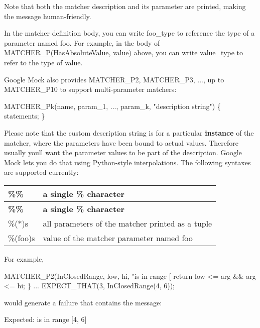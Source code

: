Note that both the matcher description and its parameter are printed, making the message human-\/friendly.

In the matcher definition body, you can write {\ttfamily foo\+\_\+type} to reference the type of a parameter named {\ttfamily foo}. For example, in the body of {\ttfamily \hyperlink{gmock-generated-matchers_8h_acb7ae915efa2fd8d3f6ea7313198afb6}{M\+A\+T\+C\+H\+E\+R\+\_\+\+P(\+Has\+Absolute\+Value, value)}} above, you can write {\ttfamily value\+\_\+type} to refer to the type of {\ttfamily value}.

Google Mock also provides {\ttfamily M\+A\+T\+C\+H\+E\+R\+\_\+\+P2}, {\ttfamily M\+A\+T\+C\+H\+E\+R\+\_\+\+P3}, ..., up to {\ttfamily M\+A\+T\+C\+H\+E\+R\+\_\+\+P10} to support multi-\/parameter matchers\+: 
\begin{DoxyCode}
MATCHER\_Pk(name, param\_1, ..., param\_k, "description string") \{ statements; \}
\end{DoxyCode}


Please note that the custom description string is for a particular {\bfseries instance} of the matcher, where the parameters have been bound to actual values. Therefore usually you\textquotesingle{}ll want the parameter values to be part of the description. Google Mock lets you do that using Python-\/style interpolations. The following syntaxes are supported currently\+:

\tabulinesep=1mm
\begin{longtabu} spread 0pt [c]{*{2}{|X[-1]}|}
\hline
\rowcolor{\tableheadbgcolor}\textbf{ {\ttfamily \%\%} }&\textbf{ a single {\ttfamily \%} character  }\\
\endfirsthead
\hline
\endfoot
\hline
\rowcolor{\tableheadbgcolor}\textbf{ {\ttfamily \%\%} }&\textbf{ a single {\ttfamily \%} character  }\\
\endhead
{\ttfamily \%($\ast$)s} &all parameters of the matcher printed as a tuple \\
{\ttfamily \%(foo)s} &value of the matcher parameter named {\ttfamily foo} \\
\end{longtabu}
For example, 
\begin{DoxyCode}
MATCHER\_P2(InClosedRange, low, hi, "is in range [%
  return low <= arg && arg <= hi;
\}
...
EXPECT\_THAT(3, InClosedRange(4, 6));
\end{DoxyCode}
 would generate a failure that contains the message\+: 
\begin{DoxyCode}
Expected: is in range [4, 6]
\end{DoxyCode}


